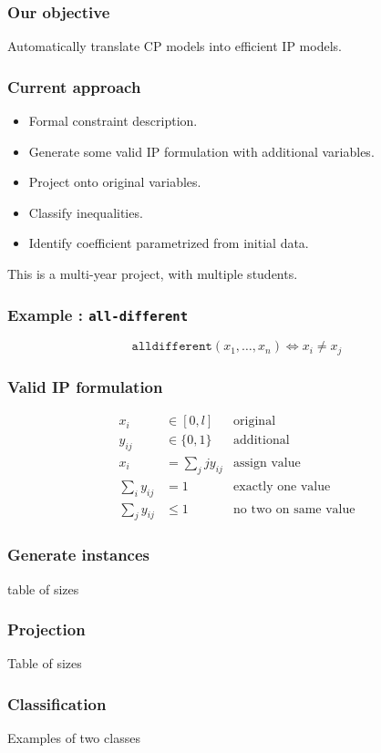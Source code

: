 \documentclass{beamer}
\begin{document}
\begin{frame}
  \frametitle{Our objective}
  Automatically translate CP models into efficient IP models.
\end{frame}

\begin{frame}
  \frametitle{Current approach}
  \begin{itemize}
  \item<1-> Formal constraint description.
  \item<2-> Generate some valid IP formulation with additional variables.
  \item<3-> Project onto original variables.
  \item<4-> Classify inequalities.
  \item<5-> Identify coefficient parametrized from initial data.
  \end{itemize}
  This is a multi-year project, with multiple students.
\end{frame}

\begin{frame}
  \frametitle{Example : \texttt{all-different}}
  \begin{displaymath}
    \mathtt{alldifferent}(x_1, \ldots, x_n) \Leftrightarrow x_i \ne x_j
  \end{displaymath}
\end{frame}

\begin{frame}
  \frametitle{Valid IP formulation}
  \begin{align*}
    x_i &\in [0,l]&\text{original}\\
    y_{ij} &\in \{0, 1\}&\text{additional}\\
    x_i &= \sum_j j y_{ij}&\text{assign value}\\
    \sum_i y_{ij} &= 1 & \text{exactly one value}\\
    \sum_j y_{ij} &\le 1&\text{no two on same value}
  \end{align*}
\end{frame}

\begin{frame}
  \frametitle{Generate instances}
  table of sizes
\end{frame}

\begin{frame}
  \frametitle{Projection}
  Table of sizes
\end{frame}

\begin{frame}
  \frametitle{Classification}
  Examples of two classes
\end{frame}
\end{document}
